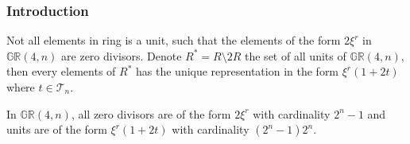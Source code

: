 \documentclass[
    aspectratio=169,                   %
]{beamer}
\renewcommand{\Bbb}{\mathbb}
\newcommand{\GR}{\mathbb{GR}}
\begin{document}

    
    \begin{frame}
        \frametitle{Introduction}
    
        Not all elements in ring is a unit, such that the elements of the form $2\xi^r$ in $\GR(4,n)$ are zero divisors. Denote $R^*=R\setminus 2R$ the set of all units of $ \GR(4,n) $, then every elements of $R^*$ has the unique representation in the form $\xi^r(1+2t)$ where $t\in\mathcal{T}_n$.

    \begin{remark}
        In $ \GR(4,n) $, all zero divisors are of the form $ 2\xi^r $ with cardinality $ 2^n-1 $ and units are of the form $ \xi^r(1+2t) $ with cardinality $ (2^n-1)2^n $.
    \end{remark}
    
    \end{frame}
   
\end{document}
